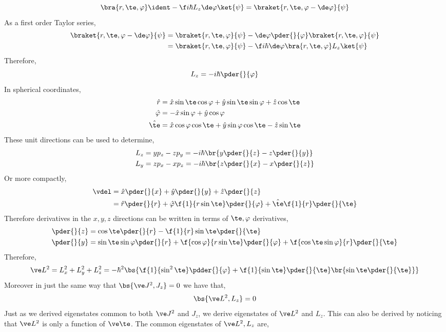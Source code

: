 \documentclass{article}
\begin{document}
\[ \bra{r, \te, \varphi} \ident - \f i \hbar L_z \de \varphi \ket{\psi} = \braket{r, \te, \varphi - \de \varphi}{\psi} \]
As a first order Taylor series,
\begin{align*}
    \braket{r, \te, \varphi - \de \varphi}{\psi}
    &= \braket{r, \te, \varphi}{\psi} - \de \varphi \pder{}{\varphi} \braket{r, \te, \varphi}{\psi} \\
    &= \braket{r, \te, \varphi}{\psi} - \f i \hbar \de \varphi \bra{r, \te, \varphi}L_z\ket{\psi}
\end{align*}
Therefore,
\[ L_z = - i \hbar \pder{}{\varphi} \]
In spherical coordinates,
\begin{align*}
    \hat r &= \hat x \sin \te \cos \varphi + \hat y \sin \te \sin \varphi + \hat z \cos \te \\
    \hat \varphi &= - \hat x \sin \varphi + \hat y \cos \varphi \\
    \hat \te &= \hat x \cos \varphi \cos \te + \hat y \sin \varphi \cos \te - \hat z \sin \te
\end{align*}
These unit directions can be used to determine,
\begin{align*}
L_z &= y p_z - z p_y = - i \hbar \br{y \pder{}{z} - z \pder{}{y}} \\
L_y &= z p_x - x p_z = - i \hbar \br{z \pder{}{x} - x \pder{}{z}}
\end{align*}
Or more compactly,
\begin{align*}
\vdel
&= \hat x \pder{}{x} + \hat y \pder{}{y} + \hat z \pder{}{z} \\
&= \hat r \pder{}{r} + \hat \varphi \f{1}{r \sin \te} \pder{}{\varphi} + \hat \te \f{1}{r}\pder{}{\te}
\end{align*}
Therefore derivatives in the $x,y,z$ directions can be written in terms of $\te, \varphi$ derivatives,
\begin{align*}
    \pder{}{z} &= \cos \te \pder{}{r} - \f{1}{r} \sin \te \pder{}{\te}\\
    \pder{}{y} &=  \sin \te \sin \varphi \pder{}{r} + \f{\cos \varphi}{r \sin \te} \pder{}{\varphi} + \f{\cos \te \sin \varphi}{r} \pder{}{\te}
\end{align*}
Therefore,
\[ \ve L^2 = L_x^2 + L_y^2 + L_z^2 = - \hbar^2 \bs{\f{1}{\sin^2 \te} \pdder{}{\varphi} + \f{1}{\sin \te} \pder{}{\te} \br{\sin \te \pder{}{\te}}} \]
Moreover in just the same way that $\bs{\ve J^2, J_z} = 0$ we have that,
\[ \bs{\ve L^2, L_z} = 0 \]
Just as we derived eigenstates common to both $\ve J^2$ and $J_z$, we derive eigenstates of $\ve L^2$ and $L_z$. This can also be derived by noticing that $\ve L^2$ is only a function of $\ve \te$. The common eigenstates of $\ve L^2, L_z$ are,
\end{document}
